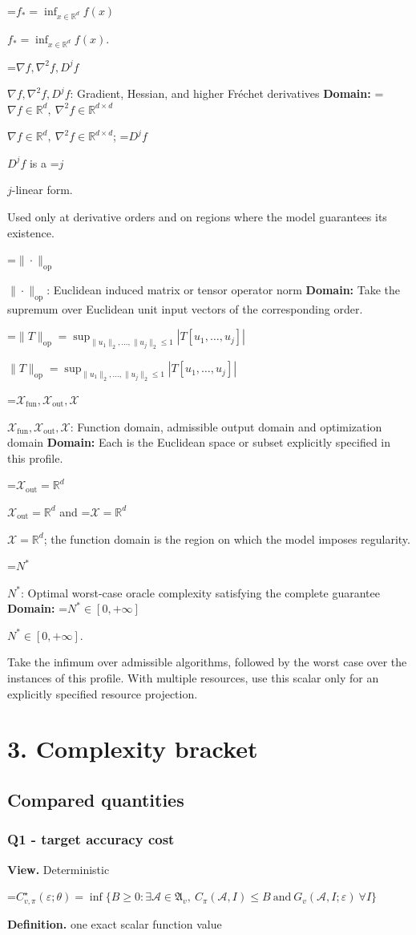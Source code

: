 \documentclass[10pt,a4paper]{article}
\newcommand{\AtlasMath}[1]{\par\begingroup\centering\setbox0=\hbox{$\displaystyle #1$}\ifdim\wd0>1.4\linewidth\typeout{ATLAS WIDE FORMULA: \the\wd0}\fi\ifdim\wd0>\linewidth\resizebox{\linewidth}{!}{\box0}\else\box0\fi\par\endgroup}
\newcommand{\AtlasInlineMath}[1]{\begingroup\setbox0=\hbox{$#1$}\ifdim\wd0>.4\linewidth\endgroup\AtlasMath{#1}\else\endgroup$#1$\fi}
\begin{document}
\AtlasInlineMath{f_*=\inf_{x\in \mathbb{R}^d}f(x)}.

\AtlasInlineMath{\nabla f,\nabla^2f,D^jf}: Gradient, Hessian, and higher Fréchet derivatives \textbf{Domain:} \AtlasInlineMath{\nabla f\in\mathbb{R}^d,\ \nabla^2f\in\mathbb{R}^{d\times d}}; \AtlasInlineMath{D^jf} is a \AtlasInlineMath{j}-linear form.

Used only at derivative orders and on regions where the model guarantees its existence.

\AtlasInlineMath{\|\cdot\|_{\mathrm{op}}}: Euclidean induced matrix or tensor operator norm \textbf{Domain:} Take the supremum over Euclidean unit input vectors of the corresponding order.

\AtlasInlineMath{\|T\|_{\mathrm{op}}=\sup_{\|u_1\|_2,\ldots,\|u_j\|_2\le1}|T[u_1,\ldots,u_j]|}

\AtlasInlineMath{\mathcal{X}_{\mathrm{fun}},\mathcal{X}_{\mathrm{out}},\mathcal{X}}: Function domain, admissible output domain and optimization domain \textbf{Domain:} Each is the Euclidean space or subset explicitly specified in this profile.

\AtlasInlineMath{\mathcal{X}_{\mathrm{out}}=\mathbb{R}^d} and \AtlasInlineMath{\mathcal{X}=\mathbb{R}^d}; the function domain is the region on which the model imposes regularity.

\AtlasInlineMath{N^*}: Optimal worst-case oracle complexity satisfying the complete guarantee \textbf{Domain:} \AtlasInlineMath{N^*\in[0,+\infty]}.

Take the infimum over admissible algorithms, followed by the worst case over the instances of this profile. With multiple resources, use this scalar only for an explicitly specified resource projection.

\section{3. Complexity bracket}
\subsection{Compared quantities}
\subsubsection{Q1 - target accuracy cost}
\textbf{View.} Deterministic

\AtlasMath{C^\star_{v,\pi}(\varepsilon;\theta)=\inf\{B\ge0:\exists\mathcal A\in\mathfrak A_v,\ C_\pi(\mathcal A,I)\le B\ \text{and}\ G_v(\mathcal A,I;\varepsilon)\ \forall I\}}
\textbf{Definition.} one exact scalar function value
\end{document}
